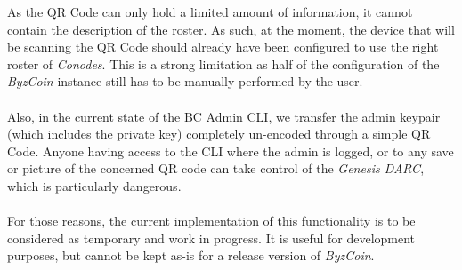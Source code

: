 As the QR Code can only hold a limited amount of information, it cannot contain the description of the roster. As such, at the moment, the device that will be scanning the QR Code should already have been configured to use the right roster of \textit{Conodes}. This is a strong limitation as half of the configuration of the \textit{ByzCoin} instance still has to be manually performed by the user.

\paragraph{}

Also, in the current state of the BC Admin CLI, we transfer the admin keypair (which includes the private key) completely un-encoded through a simple QR Code. Anyone having access to the CLI where the admin is logged, or to any save or picture of the concerned QR code can take control of the \textit{Genesis DARC}, which is particularly dangerous.

\paragraph{}

For those reasons, the current implementation of this functionality is to be considered as temporary and work in progress. It is useful for development purposes, but cannot be kept as-is for a release version of \textit{ByzCoin}.